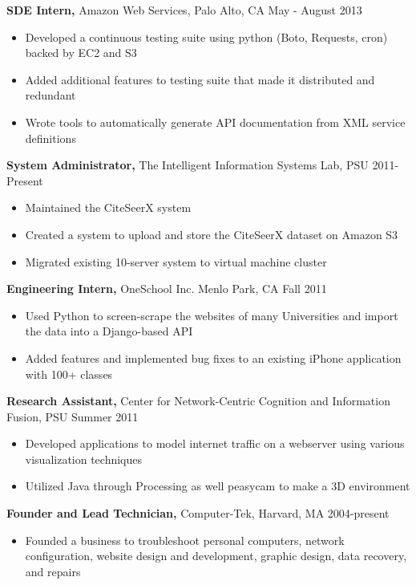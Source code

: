 \documentclass[margin]{res}
\begin{document}
\begin{resume}
{\bf SDE Intern,} Amazon Web Services, Palo Alto, CA \hfill May - August 2013
\begin{itemize} \itemsep -2pt  %
\item Developed a continuous testing suite using python (Boto, Requests, cron) backed by EC2 and S3
\item Added additional features to testing suite that made it distributed and redundant 
\item Wrote tools to automatically generate API documentation from XML service definitions
\end{itemize}

{\bf System Administrator,} The Intelligent Information Systems Lab, PSU \hfill 2011-Present
\begin{itemize} \itemsep -2pt  %
\item Maintained the CiteSeerX system 
\item Created a system to upload and store the CiteSeerX dataset on Amazon S3
\item Migrated existing 10-server system to virtual machine cluster 
\end{itemize}
 
{\bf Engineering Intern,} OneSchool Inc. Menlo Park, CA \hfill Fall 2011
\begin{itemize} \itemsep -2pt %
\item Used Python to screen-scrape the websites of many Universities and import the data into a Django-based API
\item Added features and implemented bug fixes to an existing iPhone application with 100+ classes
\end{itemize}

{\bf Research Assistant,} Center for Network-Centric Cognition and Information Fusion, PSU \hfill Summer 2011
\begin{itemize} \itemsep -2pt
\item Developed applications to model internet traffic on a webserver using various visualization techniques 
\item Utilized Java through Processing as well peasycam to make a 3D environment
\end{itemize}

{\bf Founder and Lead Technician,} Computer-Tek, Harvard, MA \hfill 2004-present
\begin{itemize} \itemsep -2pt
\item Founded a business to troubleshoot personal computers, network configuration, website design and development, graphic design, data recovery, and repairs
\end{itemize}


\end{resume}
\end{document}
